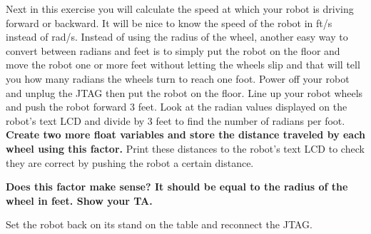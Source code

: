 \documentclass[11pt]{article}
\begin{document}
Next in this exercise you will calculate the speed at which your robot is driving forward or backward. It will be nice to know the speed of the robot in ft/s instead of rad/s. Instead of using the radius of the wheel, another easy way to convert between radians and feet is to simply put the robot on the floor and move the robot one or more feet without letting the wheels slip and that will tell you how many radians the wheels turn to reach one foot. Power off your robot and unplug the JTAG then put the robot on the floor. Line up your robot wheels and push the robot forward 3 feet. Look at the radian values displayed on the robot’s text LCD and divide by 3 feet to find the number of radians per foot. \textbf{Create two more float variables and store the distance traveled by each wheel using this factor.} Print these distances to the robot’s text LCD to check they are correct by pushing the robot a certain distance.
%
\begin{checkoff}
        \textbf{Does this factor make sense? It should be equal to the radius of the wheel in feet. Show your TA.}
\end{checkoff}
%
Set the robot back on its stand on the table and reconnect the JTAG.
\end{document}
